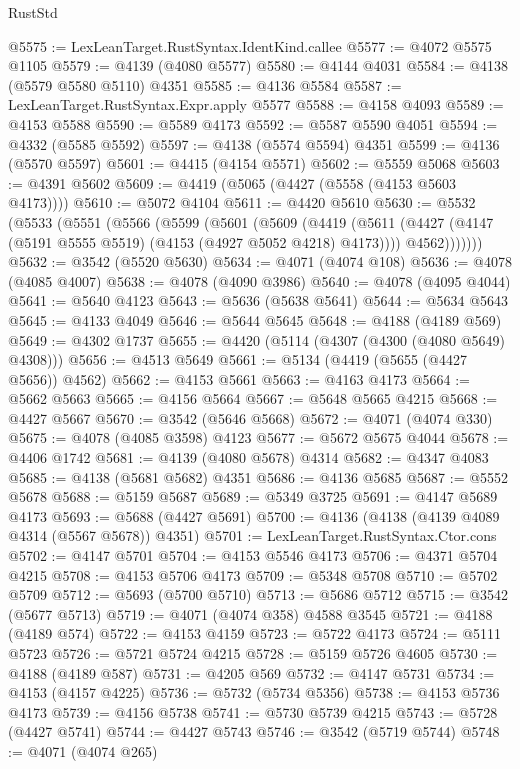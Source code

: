 \begin{lexlean}{RustStd}
\begin{coremodule}
@5575 := LexLeanTarget.RustSyntax.IdentKind.callee
@5577 := @4072 @5575 @1105
@5579 := @4139 (@4080 @5577)
@5580 := @4144 @4031
@5584 := @4138 (@5579 @5580 @5110) @4351
@5585 := @4136 @5584
@5587 := LexLeanTarget.RustSyntax.Expr.apply @5577
@5588 := @4158 @4093
@5589 := @4153 @5588
@5590 := @5589 @4173
@5592 := @5587 @5590 @4051
@5594 := @4332 (@5585 @5592)
@5597 := @4138 (@5574 @5594) @4351
@5599 := @4136 (@5570 @5597)
@5601 := @4415 (@4154 @5571)
@5602 := @5559 @5068
@5603 := @4391 @5602
@5609 := @4419 (@5065 (@4427 (@5558 (@4153 @5603 @4173))))
@5610 := @5072 @4104
@5611 := @4420 @5610
@5630 := @5532
    (@5533
      (@5551
        (@5566
          (@5599
            (@5601
              (@5609
                (@4419
                  (@5611 (@4427 (@4147 (@5191 @5555 @5519) (@4153 (@4927 @5052 @4218) @4173))))
                  @4562)))))))
@5632 := @3542 (@5520 @5630)
@5634 := @4071 (@4074 @108)
@5636 := @4078 (@4085 @4007)
@5638 := @4078 (@4090 @3986)
@5640 := @4078 (@4095 @4044)
@5641 := @5640 @4123
@5643 := @5636 (@5638 @5641)
@5644 := @5634 @5643
@5645 := @4133 @4049
@5646 := @5644 @5645
@5648 := @4188 (@4189 @569)
@5649 := @4302 @1737
@5655 := @4420 (@5114 (@4307 (@4300 (@4080 @5649) @4308)))
@5656 := @4513 @5649
@5661 := @5134 (@4419 (@5655 (@4427 @5656)) @4562)
@5662 := @4153 @5661
@5663 := @4163 @4173
@5664 := @5662 @5663
@5665 := @4156 @5664
@5667 := @5648 @5665 @4215
@5668 := @4427 @5667
@5670 := @3542 (@5646 @5668)
@5672 := @4071 (@4074 @330)
@5675 := @4078 (@4085 @3598) @4123
@5677 := @5672 @5675 @4044
@5678 := @4406 @1742
@5681 := @4139 (@4080 @5678) @4314
@5682 := @4347 @4083
@5685 := @4138 (@5681 @5682) @4351
@5686 := @4136 @5685
@5687 := @5552 @5678
@5688 := @5159 @5687
@5689 := @5349 @3725
@5691 := @4147 @5689 @4173
@5693 := @5688 (@4427 @5691)
@5700 := @4136 (@4138 (@4139 @4089 @4314 (@5567 @5678)) @4351)
@5701 := LexLeanTarget.RustSyntax.Ctor.cons
@5702 := @4147 @5701
@5704 := @4153 @5546 @4173
@5706 := @4371 @5704 @4215
@5708 := @4153 @5706 @4173
@5709 := @5348 @5708
@5710 := @5702 @5709
@5712 := @5693 (@5700 @5710)
@5713 := @5686 @5712
@5715 := @3542 (@5677 @5713)
@5719 := @4071 (@4074 @358) @4588 @3545
@5721 := @4188 (@4189 @574)
@5722 := @4153 @4159
@5723 := @5722 @4173
@5724 := @5111 @5723
@5726 := @5721 @5724 @4215
@5728 := @5159 @5726 @4605
@5730 := @4188 (@4189 @587)
@5731 := @4205 @569
@5732 := @4147 @5731
@5734 := @4153 (@4157 @4225)
@5736 := @5732 (@5734 @5356)
@5738 := @4153 @5736 @4173
@5739 := @4156 @5738
@5741 := @5730 @5739 @4215
@5743 := @5728 (@4427 @5741)
@5744 := @4427 @5743
@5746 := @3542 (@5719 @5744)
@5748 := @4071 (@4074 @265)

\end{coremodule}
\end{lexlean}
